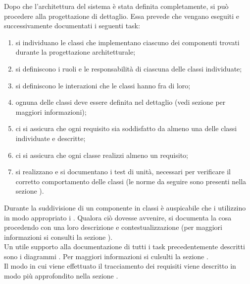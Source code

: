 			Dopo che l'architettura del sistema è stata definita completamente, si può procedere alla progettazione di dettaglio. Essa prevede che vengano eseguiti e successivamente documentati i seguenti task:
			\begin{enumerate}
				\item si individuano le classi che implementano ciascuno dei componenti trovati durante la progettazione architetturale;
				\item si definiscono i ruoli e le responsabilità di ciascuna delle classi individuate;
				\item si definiscono le interazioni che le classi hanno fra di loro;
				\item ognuna delle classi deve essere definita nel dettaglio (vedi sezione  per maggiori informazioni);
				\item ci si assicura che ogni requisito sia soddisfatto da almeno una delle classi individuate e descritte;
				\item ci si assicura che ogni classe realizzi almeno un requisito;
				\item si realizzano e si documentano i test di unità, necessari per verificare il corretto comportamento delle classi (le norme da seguire sono presenti nella sezione ).
			\end{enumerate}
			Durante la suddivisione di un componente in classi è auspicabile che i  utilizzino in modo appropriato i . Qualora ciò dovesse avvenire, si documenta la cosa procedendo con una loro descrizione e contestualizzazione (per maggiori informazioni si consulti la sezione ).\\
			Un utile supporto alla documentazione di tutti i task precedentemente descritti sono i diagrammi . Per maggiori informazioni si culsulti la sezione .\\
			Il modo in cui viene effettuato il tracciamento dei requisiti viene descritto in modo più approfondito nella sezione .

